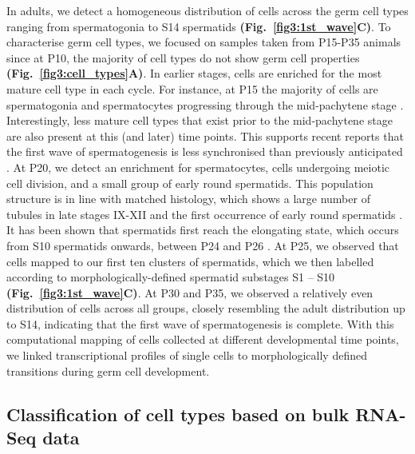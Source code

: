 In adults, we detect a homogeneous distribution of cells across the germ cell types ranging from spermatogonia to S14 spermatids \textbf{(Fig.~\ref{fig3:1st_wave}C)}. To characterise germ cell types, we focused on samples taken from P15-P35 animals since at P10, the majority of cell types do not show germ cell properties \textbf{(Fig.~\ref{fig3:cell_types}A)}. In earlier stages, cells are enriched for the most mature cell type in each cycle. For instance, at P15 the majority of cells are spermatogonia and spermatocytes progressing through the mid-pachytene stage \citep{Turner2004}. Interestingly, less mature cell types that exist prior to the mid-pachytene stage are also present at this (and later) time points. This supports recent reports that the first wave of spermatogenesis is less synchronised than previously anticipated \citep{Snyder2010}. At P20, we detect an enrichment for spermatocytes, cells undergoing meiotic cell division, and a small group of early round spermatids. This population structure is in line with matched histology, which shows a large number of tubules in late stages IX-XII and the first occurrence of early round spermatids \citep{Bellve1977}. It has been shown that spermatids first reach the elongating state, which occurs from S10 spermatids onwards, between P24 and P26 \citep{Janca1986}. At P25, we observed that cells mapped to our first ten clusters of spermatids, which we then labelled according to morphologically-defined spermatid substages S1 – S10 \textbf{(Fig.~\ref{fig3:1st_wave}C)}. At P30 and P35, we observed a relatively even distribution of cells across all groups, closely resembling the adult distribution up to S14, indicating that the first wave of spermatogenesis is complete. With this computational mapping of cells collected at different developmental time points, we linked transcriptional profiles of single cells to morphologically defined transitions during germ cell development.

\newpage

\subsection{Classification of cell types based on bulk RNA-Seq data}

